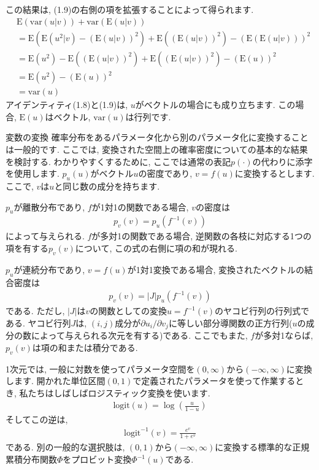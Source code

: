 \documentclass[10pt,dvipdfmx,a4]{beamer}
\newcommand{\eq}[1]{\begin{align}#1\end{align}}
\newcommand{\eqn}[1]{\begin{align*}#1\end{align*}}
\begin{document}

\begin{frame}
この結果は, (1.9)の右側の項を拡張することによって得られます.
\eqn{&\text{E}(\text{var}(u|v))+\text{var}(\text{E}(u|v))\\
&=\text{E}(\text{E}(u^2|v)-(\text{E}(u|v))^2)+\text{E}((\text{E}(u|v))^2)-(\text{E}(\text{E}(u|v)))^2\\
&=\text{E}(u^2)-\text{E}((\text{E}(u|v))^2)+\text{E}((\text{E}(u|v))^2)-(\text{E}(u))^2\\
&=\text{E}(u^2)-(\text{E}(u))^2\\
&=\text{var}(u)}
アイデンティティ(1.8)と(1.9)は, $u$がベクトルの場合にも成り立ちます.
この場合, $\text{E}(u)$はベクトル, $\text{var}(u)$は行列です.
\end{frame}


\begin{frame}{変数の変換}
確率分布をあるパラメータ化から別のパラメータ化に変換することは一般的です.
ここでは, 変換された空間上の確率密度についての基本的な結果を検討する.
わかりやすくするために, ここでは通常の表記$p(\cdot)$の代わりに添字を使用します.
$p_u(u)$がベクトル$u$の密度であり, $v=f(u)$に変換するとします.
ここで, $v$は$u$と同じ数の成分を持ちます.

$p_u$が離散分布であり, $f$が1対1の関数である場合, $v$の密度は
\eqn{p_v(v)=p_u(f^{-1}(v))}
によって与えられる.
$f$が多対1の関数である場合, 逆関数の各枝に対応する1つの項を有する$p_v(v)$について, この式の右側に項の和が現れる.

$p_u$が連続分布であり, $v=f(u)$が1対1変換である場合, 変換されたベクトルの結合密度は
\eqn{p_v(v)=|J|p_u(f^{-1}(v))}
である.
ただし, $|J|$は$v$の関数としての変換$u=f^{-1}(v)$のヤコビ行列の行列式である.
ヤコビ行列$J$は, $(i,j)$成分が$\partial u_i/\partial v_j$に等しい部分導関数の正方行列($u$の成分の数によって与えられる次元を有する)である.
ここでもまた, $f$が多対1ならば, $p_v(v)$は項の和または積分である.
\end{frame}


\begin{frame}
1次元では, 一般に対数を使ってパラメータ空間を$(0,\infty)$から$(-\infty,\infty)$に変換します.
開かれた単位区間$(0,1)$で定義されたパラメータを使って作業するとき, 私たちはしばしばロジスティック変換を使います.
\eq{\text{logit}(u)=\log \left(\frac{u}{1-u}\right)}
そしてこの逆は,
\eqn{\text{logit}^{-1}(v)=\frac{e^v}{1+e^v}}
である.
別の一般的な選択肢は, $(0,1)$から$(-\infty,\infty)$に変換する標準的な正規累積分布関数$\Phi$をプロビット変換$\Phi^{-1}(u)$である.\end{frame}
\end{document}
